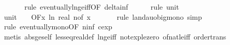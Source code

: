 \begin{isabellebody}
\ \ \ \ \ \isamarkupfalse%
\ {\isacharparenleft}{\kern0pt}rule\ eventually{\isacharunderscore}{\kern0pt}ln{\isacharunderscore}{\kern0pt}ge{\isacharunderscore}{\kern0pt}iff{\isacharbrackleft}{\kern0pt}OF\ delta{\isacharunderscore}{\kern0pt}inf{\isacharbrackright}{\kern0pt}{\isacharparenright}{\kern0pt}\isanewline
\ \ \ \ \isamarkupfalse%
\ {\isacharparenleft}{\kern0pt}rule\ unit{\isacharunderscore}{\kern0pt}{}{\isacharparenright}{\kern0pt}\isanewline
\isanewline
\ \ \isamarkupfalse%
\ unit{\isacharunderscore}{\kern0pt}{}{\isacharcolon}{\kern0pt}\ {\isachardoublequoteopen}{\isacharparenleft}{\kern0pt}{\isasymlambda}{\isacharunderscore}{\kern0pt}{\isachardot}{\kern0pt}\ {}{\isacharparenright}{\kern0pt}\ {\isasymin}\ O{\isacharbrackleft}{\kern0pt}{\isacharquery}{\kern0pt}F{\isacharbrackright}{\kern0pt}{\isacharparenleft}{\kern0pt}{\isasymlambda}x{\isachardot}{\kern0pt}\ ln\ {\isacharparenleft}{\kern0pt}real\ {\isacharparenleft}{\kern0pt}n{\isacharunderscore}{\kern0pt}of\ x{\isacharparenright}{\kern0pt}{\isacharparenright}{\kern0pt}{\isacharparenright}{\kern0pt}{\isachardoublequoteclose}\ \isanewline
\ \ \ \ \isamarkupfalse%
\ {\isacharparenleft}{\kern0pt}rule\ landau{\isacharunderscore}{\kern0pt}o{\isachardot}{\kern0pt}big{\isacharunderscore}{\kern0pt}mono{\isacharcomma}{\kern0pt}\ simp{\isacharparenright}{\kern0pt}\isanewline
\ \ \ \ \isamarkupfalse%
\ {\isacharparenleft}{\kern0pt}rule\ eventually{\isacharunderscore}{\kern0pt}mono{\isacharbrackleft}{\kern0pt}OF\ n{\isacharunderscore}{\kern0pt}inf{\isacharbrackleft}{\kern0pt}\ c{\isacharequal}{\kern0pt}{\isachardoublequoteopen}exp\ {}{\isachardoublequoteclose}{\isacharbrackright}{\kern0pt}{\isacharbrackright}{\kern0pt}{\isacharparenright}{\kern0pt}\isanewline
\ \ \ \ \isamarkupfalse%
\ {\isacharparenleft}{\kern0pt}metis\ abs{\isacharunderscore}{\kern0pt}ge{\isacharunderscore}{\kern0pt}self\ less{\isacharunderscore}{\kern0pt}eq{\isacharunderscore}{\kern0pt}real{\isacharunderscore}{\kern0pt}def\ ln{\isacharunderscore}{\kern0pt}ge{\isacharunderscore}{\kern0pt}iff\ not{\isacharunderscore}{\kern0pt}exp{\isacharunderscore}{\kern0pt}le{\isacharunderscore}{\kern0pt}zero\ of{\isacharunderscore}{\kern0pt}nat{\isacharunderscore}{\kern0pt}{}{\isacharunderscore}{\kern0pt}le{\isacharunderscore}{\kern0pt}iff\ order{\isachardot}{\kern0pt}trans{\isacharparenright}{\kern0pt}\isanewline
\isanewline
\ \ \isamarkupfalse%

\end{isabellebody}

